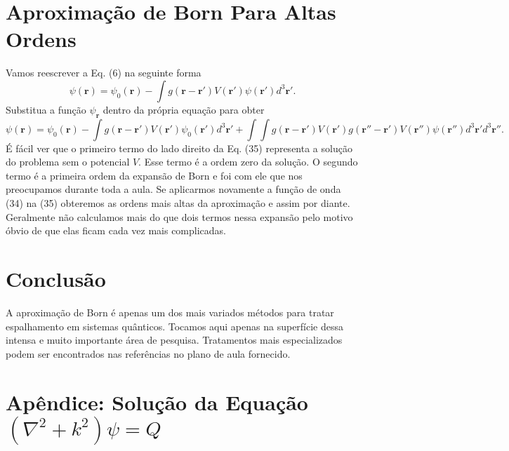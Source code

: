 \documentclass{article}
\begin{document}
\section{Aproximação de Born Para Altas Ordens}

Vamos reescrever a Eq. (6) na seguinte forma
\begin{equation}
    \psi(\mathbf{r}) = \psi_0 (\mathbf{r}) - \int g(\mathbf{r}-\mathbf{r}')V(\mathbf{r}')\psi(\mathbf{r}')d^3 {\mathbf{r}}'.
\end{equation}
Substitua a função $\psi_{\mathbf{r}}$ dentro da própria equação para obter
\begin{equation}
    \psi(\mathbf{r}) = \psi_0 (\mathbf{r}) - \int g(\mathbf{r}-\mathbf{r}')V(\mathbf{r}')\psi_0(\mathbf{r}')d^3 {\mathbf{r}}' + \int\int g(\mathbf{r}-\mathbf{r}')V(\mathbf{r}')g(\mathbf{r}''-\mathbf{r}')V(\mathbf{r}'') \psi (\mathbf{r}'') d^3 {\mathbf{r}}'d^3 {\mathbf{r}}''.
\end{equation}
É fácil ver que o primeiro termo do lado direito da Eq. (35) representa a solução do problema sem o potencial $V$. Esse termo é a ordem zero da solução. O segundo termo é a primeira ordem da expansão de Born e foi com ele que nos preocupamos durante toda a aula. Se aplicarmos novamente a função de onda (34) na (35) obteremos as ordens mais altas da aproximação e assim por diante. Geralmente não calculamos mais do que dois termos nessa expansão pelo motivo óbvio de que elas ficam cada vez mais complicadas.


\section{Conclusão}

A aproximação de Born é apenas um dos mais variados métodos para tratar espalhamento em sistemas quânticos. Tocamos aqui apenas na superfície dessa intensa e muito importante área de pesquisa. Tratamentos mais especializados podem ser encontrados nas referências no plano de aula fornecido.




\section*{Apêndice:  Solução da Equação $(\nabla^2 + k^2)\psi = Q$}
\end{document}

